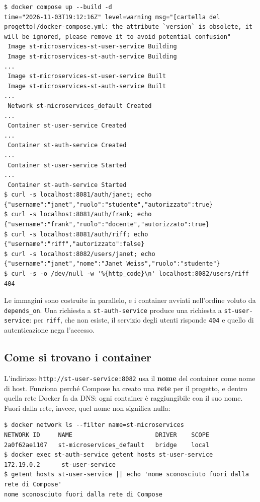 \begin{lstlisting}[style=shell, name=Terminale]
$ docker compose up --build -d
time="2026-11-03T19:12:16Z" level=warning msg="[cartella del progetto]/docker-compose.yml: the attribute `version` is obsolete, it will be ignored, please remove it to avoid potential confusion"
 Image st-microservices-st-user-service Building
 Image st-microservices-st-auth-service Building
...
 Image st-microservices-st-user-service Built
 Image st-microservices-st-auth-service Built
...
 Network st-microservices_default Created
...
 Container st-user-service Created
...
 Container st-auth-service Created
...
 Container st-user-service Started
...
 Container st-auth-service Started
$ curl -s localhost:8081/auth/janet; echo
{"username":"janet","ruolo":"studente","autorizzato":true}
$ curl -s localhost:8081/auth/frank; echo
{"username":"frank","ruolo":"docente","autorizzato":true}
$ curl -s localhost:8081/auth/riff; echo
{"username":"riff","autorizzato":false}
$ curl -s localhost:8082/users/janet; echo
{"username":"janet","nome":"Janet Weiss","ruolo":"studente"}
$ curl -s -o /dev/null -w '%{http_code}\n' localhost:8082/users/riff
404
\end{lstlisting}

Le immagini sono costruite in parallelo, e i container avviati nell'ordine voluto da \texttt{depends\_on}. Una
richiesta a \texttt{st-auth-service} produce una richiesta a \texttt{st-user-service}: per \texttt{riff}, che non
esiste, il servizio degli utenti risponde \texttt{404} e quello di autenticazione nega l'accesso.

\subsection{Come si trovano i container}

L'indirizzo \texttt{http://st-user-service:8082} usa il \textbf{nome} del container come nome di host. Funziona perché
Compose ha creato una \textbf{rete} per il progetto, e dentro quella rete Docker fa da DNS: ogni container è
raggiungibile con il suo nome. Fuori dalla rete, invece, quel nome non significa nulla:

\begin{lstlisting}[style=shell, name=Terminale]
$ docker network ls --filter name=st-microservices
NETWORK ID     NAME                       DRIVER    SCOPE
2a0f62ae1107   st-microservices_default   bridge    local
$ docker exec st-auth-service getent hosts st-user-service
172.19.0.2      st-user-service
$ getent hosts st-user-service || echo 'nome sconosciuto fuori dalla rete di Compose'
nome sconosciuto fuori dalla rete di Compose
\end{lstlisting}

